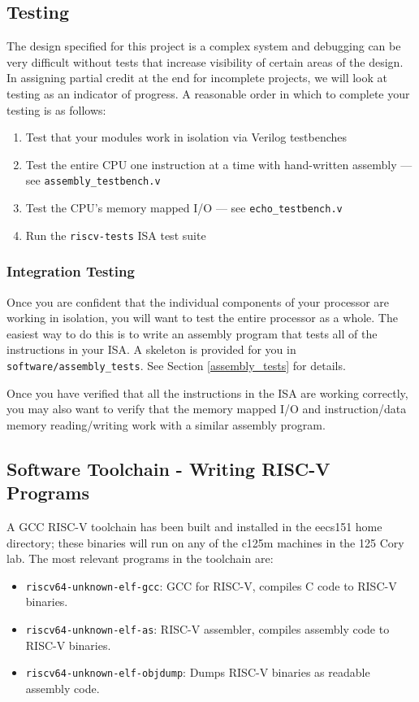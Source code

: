 \documentclass[11pt]{article}
\begin{document}
\subsection{Testing}
\label{testing}
The design specified for this project is a complex system and debugging can be very difficult without tests that increase visibility of certain areas of the design.
In assigning partial credit at the end for incomplete projects, we will look at testing as an indicator of progress.
A reasonable order in which to complete your testing is as follows:

\begin{enumerate}
  \item Test that your modules work in isolation via Verilog testbenches
  \item Test the entire CPU one instruction at a time with hand-written assembly --- see \verb|assembly_testbench.v|
  \item Test the CPU's memory mapped I/O --- see \verb|echo_testbench.v|
  \item Run the \verb|riscv-tests| ISA test suite
\end{enumerate}

\subsubsection{Integration Testing}
Once you are confident that the individual components of your processor are working in isolation, you will want to test the entire processor as a whole. The easiest way to do this is to write an assembly program that tests all of the instructions in your ISA.
A skeleton is provided for you in \verb|software/assembly_tests|.
See Section \ref{assembly_tests} for details.

Once you have verified that all the instructions in the ISA are working correctly, you may also want to verify that the memory mapped I/O and instruction/data memory reading/writing work with a similar assembly program.

\subsection{Software Toolchain - Writing RISC-V Programs}
\label{toolchain}
A GCC RISC-V toolchain has been built and installed in the eecs151 home directory; these binaries will run on any of the c125m machines in the 125 Cory lab.
The most relevant programs in the toolchain are:
\begin{itemize}
    \item \verb|riscv64-unknown-elf-gcc|: GCC for RISC-V, compiles C code to RISC-V binaries.
    \item \verb|riscv64-unknown-elf-as|: RISC-V assembler, compiles assembly code to RISC-V binaries.
    \item \verb|riscv64-unknown-elf-objdump|: Dumps RISC-V binaries as readable assembly code.
\end{itemize}
\end{document}
